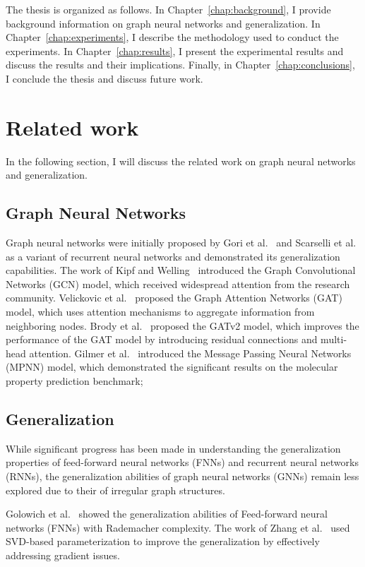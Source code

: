 The thesis is organized as follows. In Chapter~\ref{chap:background}, I provide background information on graph neural networks and generalization. In Chapter~\ref{chap:experiments}, I describe the methodology used to conduct the experiments. In Chapter~\ref{chap:results}, I present the experimental results and discuss the results and their implications. Finally, in Chapter~\ref{chap:conclusions}, I conclude the thesis and discuss future work.


\section{Related work}
In the following section, I will discuss the related work on graph neural networks and generalization.

\subsection{Graph Neural Networks}
Graph neural networks were initially proposed by Gori et al.~\cite{gori2005new} and Scarselli et al.~\cite{scarselli2008graph} as a variant of recurrent neural networks and demonstrated its generalization capabilities. The work of Kipf and Welling~\cite{kipf2016semi} introduced the Graph Convolutional Networks (GCN) model, which received widespread attention from the research community. Velickovic et al.~\cite{velickovic2020pointer} proposed the Graph Attention Networks (GAT) model, which uses attention mechanisms to aggregate information from neighboring nodes. Brody et al.~\cite{brody2021attentive} proposed the GATv2 model, which improves the performance of the GAT model by introducing residual connections and multi-head attention. Gilmer et al.~\cite{gilmer2017neural} introduced the Message Passing Neural Networks (MPNN) model, which demonstrated the significant results on the molecular property prediction benchmark;

\subsection{Generalization}
While significant progress has been made in understanding the generalization properties of feed-forward neural networks (FNNs) and recurrent neural networks (RNNs), the generalization abilities of graph neural networks (GNNs) remain less explored due to their of irregular graph structures.

Golowich et al.~\cite{golowich2018size} showed the generalization abilities of Feed-forward neural networks (FNNs) with Rademacher complexity. The work of Zhang et al.~\cite{zhang2018stabilizing} used SVD-based parameterization to improve the generalization by effectively addressing gradient issues.


